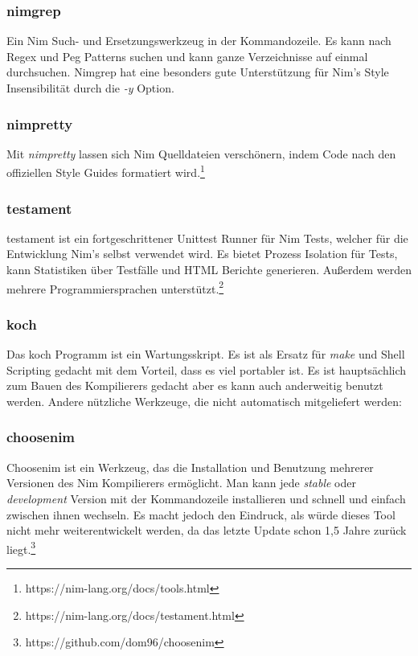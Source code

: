 \documentclass[11pt]{report}
\begin{document}
\subsubsection{nimgrep}
Ein Nim Such- und Ersetzungswerkzeug in der Kommandozeile. Es kann nach Regex und Peg Patterns suchen und kann ganze Verzeichnisse auf einmal durchsuchen. Nimgrep hat eine besonders gute Unterstützung für Nim's Style Insensibilität durch die \emph{-y} Option.

\subsubsection{nimpretty}
Mit \emph{nimpretty} lassen sich Nim Quelldateien verschönern, indem Code nach den offiziellen Style Guides formatiert wird.\footnote{https://nim-lang.org/docs/tools.html}

\subsubsection{testament}
testament ist ein fortgeschrittener Unittest Runner für Nim Tests, welcher für die Entwicklung Nim's selbst verwendet wird. Es bietet Prozess Isolation für Tests, kann Statistiken über Testfälle und HTML Berichte generieren. Außerdem werden mehrere Programmiersprachen unterstützt.\footnote{https://nim-lang.org/docs/testament.html}

\subsubsection{koch}
Das koch Programm ist ein Wartungsskript. Es ist als Ersatz für \emph{make} und Shell Scripting gedacht mit dem Vorteil, dass es viel portabler ist. Es ist hauptsächlich zum Bauen des Kompilierers gedacht aber es kann auch anderweitig benutzt werden.
\newline\newline\newline
Andere nützliche Werkzeuge, die nicht automatisch mitgeliefert werden:

\subsubsection{choosenim}
Choosenim ist ein Werkzeug, das die Installation und Benutzung mehrerer Versionen des Nim Kompilierers ermöglicht. Man kann jede \emph{stable} oder \emph{development} Version mit der Kommandozeile installieren und schnell und einfach zwischen ihnen wechseln.
Es macht jedoch den Eindruck, als würde dieses Tool nicht mehr weiterentwickelt werden, da das letzte Update schon 1,5 Jahre zurück liegt.\footnote{https://github.com/dom96/choosenim}
\end{document}
